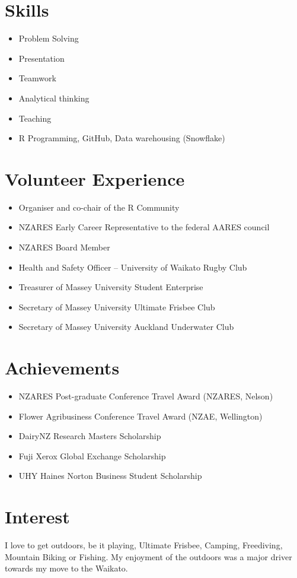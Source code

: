 \documentclass[11pt,a4paper,]{moderncv}
\providecommand{\tightlist}{%
	\setlength{\itemsep}{0pt}\setlength{\parskip}{0pt}}
\begin{document}
\section{Skills}\label{skills}

\begin{itemize}
\tightlist
\item
  Problem Solving
\item
  Presentation
\item
  Teamwork
\item
  Analytical thinking
\item
  Teaching
\item
  R Programming, GitHub, Data warehousing (Snowflake)
\end{itemize}

\section{Volunteer Experience}\label{volunteer-experience}

\begin{itemize}
\tightlist
\item
  Organiser and co-chair of the R Community
\item
  NZARES Early Career Representative to the federal AARES council
\item
  NZARES Board Member
\item
  Health and Safety Officer -- University of Waikato Rugby Club
\item
  Treasurer of Massey University Student Enterprise
\item
  Secretary of Massey University Ultimate Frisbee Club
\item
  Secretary of Massey University Auckland Underwater Club
\end{itemize}

\section{Achievements}\label{achievements}

\begin{itemize}
\tightlist
\item
  NZARES Post-graduate Conference Travel Award (NZARES, Nelson)
\item
  Flower Agribusiness Conference Travel Award (NZAE, Wellington)
\item
  DairyNZ Research Masters Scholarship
\item
  Fuji Xerox Global Exchange Scholarship
\item
  UHY Haines Norton Business Student Scholarship
\end{itemize}

\section{Interest}\label{interest}

I love to get outdoors, be it playing, Ultimate Frisbee, Camping,
Freediving, Mountain Biking or Fishing. My enjoyment of the outdoors was
a major driver towards my move to the Waikato.
\end{document}
